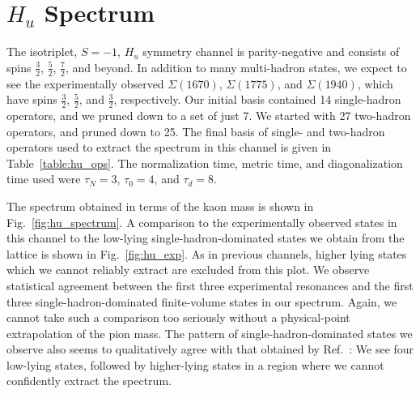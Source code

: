 \section{$H_u$ Spectrum}
The isotriplet, $S=-1$, $H_u$ symmetry channel is parity-negative and consists of spins $\frac{3}{2}$, $\frac{5}{2}$, $\frac{7}{2}$, and beyond. In addition to many multi-hadron states, we expect to see the experimentally observed $\Sigma(1670)$, $\Sigma(1775)$, and $\Sigma(1940)$, which have spins $\frac{3}{2}$, $\frac{5}{2}$, and $\frac{3}{2}$, respectively. Our initial basis contained 14 single-hadron operators, and we pruned down to a set of just 7. We started with 27 two-hadron operators, and pruned down to 25. The final basis of single- and two-hadron operators used to extract the spectrum in this channel is given in Table~\ref{table:hu_ops}. The normalization time, metric time, and diagonalization time used were $\tau_N=3$, $\tau_0=4$, and $\tau_d=8$.

The spectrum obtained in terms of the kaon mass is shown in Fig.~\ref{fig:hu_spectrum}. A comparison to the experimentally observed states in this channel to the low-lying single-hadron-dominated states we obtain from the lattice is shown in Fig.~\ref{fig:hu_exp}. As in previous channels, higher lying states which we cannot reliably extract are excluded from this plot. We observe statistical agreement between the first three experimental resonances and the first three single-hadron-dominated finite-volume states in our spectrum. Again, we cannot take such a comparison too seriously without a physical-point extrapolation of the pion mass. The pattern of single-hadron-dominated states we observe also seems to qualitatively agree with that obtained by Ref.~\cite{Edwards:2012fx}: We see four low-lying states, followed by higher-lying states in a region where we cannot confidently extract the spectrum.


